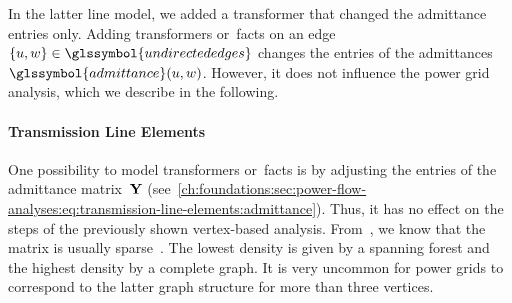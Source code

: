 In the latter line model, we added a transformer that changed the admittance
entries only. Adding transformers or~\gls{facts} on an edge
$\{\vertexa,\vertexc\} \in \glssymbol{undirectededges}$ changes the entries of
the admittances~$\glssymbol{admittance}(\vertexa,\vertexc)$. However, it does
not influence the power grid analysis, which we describe in the following.
% 
% 
\paragraph{Transmission Line Elements}
\label{ch:foundations:sec:power-flow-analyses:transmission-line-elements}
% 
One possibility to model transformers or~\gls{facts} is by adjusting the entries
of the admittance matrix~$\mathbf{Y}$
(see~\cref{ch:foundations:sec:power-flow-analyses:eq:transmission-line-elements:admittance}).
Thus, it has no effect on the steps of the previously shown vertex-based
analysis. From~\citeauthor{Cai12}, we know that the matrix is usually
sparse~\parencite[p.17]{Cai12}. 
% 
% 
The lowest density is given by a spanning forest and the highest density by a
complete graph. It is very uncommon for power grids to correspond to the latter
graph structure for more than three vertices.

